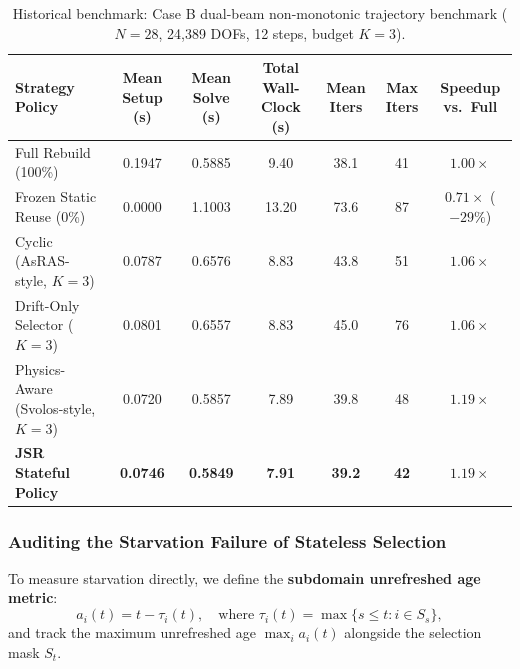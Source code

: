 \documentclass[preprint,12pt,3p]{elsarticle}
\begin{document}
\begin{table}[htbp]
\centering
\small
\caption{Historical benchmark: Case B dual-beam non-monotonic trajectory benchmark ($N=28$, 24,389 DOFs, 12 steps, budget $K=3$).}
\label{tab:case_b_dual_beam}
\begin{tabular}{lcccccc}
\toprule
\textbf{Strategy Policy} & \textbf{Mean Setup (s)} & \textbf{Mean Solve (s)} & \textbf{Total Wall-Clock (s)} & \textbf{Mean Iters} & \textbf{Max Iters} & \textbf{Speedup vs.\ Full} \\
\midrule
Full Rebuild (100\%) & 0.1947 & 0.5885 & 9.40 & 38.1 & 41 & $1.00\times$ \\
Frozen Static Reuse (0\%) & 0.0000 & 1.1003 & 13.20 & 73.6 & 87 & $0.71\times$ ($-29\%$) \\
Cyclic (AsRAS-style, $K=3$) & 0.0787 & 0.6576 & 8.83 & 43.8 & 51 & $1.06\times$ \\
Drift-Only Selector ($K=3$) & 0.0801 & 0.6557 & 8.83 & 45.0 & 76 & $1.06\times$ \\
Physics-Aware (Svolos-style, $K=3$) & 0.0720 & 0.5857 & 7.89 & 39.8 & 48 & $1.19\times$ \\
\textbf{JSR Stateful Policy} & \textbf{0.0746} & \textbf{0.5849} & \textbf{7.91} & \textbf{39.2} & \textbf{42} & $\mathbf{1.19\times}$ \\
\bottomrule
\end{tabular}
\end{table}

\subsubsection{Auditing the Starvation Failure of Stateless Selection}
To measure starvation directly, we define the \textbf{subdomain unrefreshed age metric}:
\begin{equation}
a_i(t) = t - \tau_i(t), \quad \text{where } \tau_i(t) = \max \{s \le t : i \in S_s\},
\end{equation}
and track the maximum unrefreshed age $\max_i a_i(t)$ alongside the selection mask $S_t$.
\end{document}
